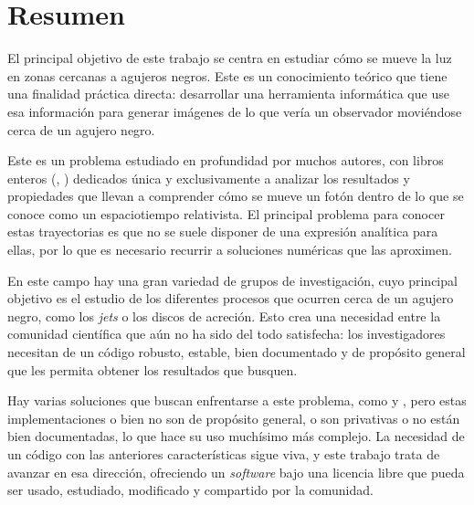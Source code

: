 \begingroup
\let\clearpage\relax
\let\cleardoublepage\relax
\let\cleardoublepage\relax

\chapter*{Resumen}

El principal objetivo de este trabajo se centra en estudiar cómo se mueve la luz en zonas cercanas a agujeros negros. Este es un conocimiento teórico que tiene una finalidad práctica directa: desarrollar una herramienta informática que use esa información para generar imágenes de lo que vería un observador moviéndose cerca de un agujero negro.

Este es un problema estudiado en profundidad por muchos autores, con libros enteros (\cite{oneill83}, \cite{oneill95}) dedicados única y exclusivamente a analizar los resultados y propiedades que llevan a comprender cómo se mueve un fotón dentro de lo que se conoce como un espaciotiempo relativista. El principal problema para conocer estas trayectorias es que no se suele disponer de una expresión analítica para ellas, por lo que es necesario recurrir a soluciones numéricas que las aproximen.

En este campo hay una gran variedad de grupos de investigación, cuyo principal objetivo es el estudio de los diferentes procesos que ocurren cerca de un agujero negro, como los \emph{jets} o los discos de acreción. Esto crea una necesidad entre la comunidad científica que aún no ha sido del todo satisfecha: los investigadores necesitan de un código robusto, estable, bien documentado y de propósito general que les permita obtener los resultados que busquen.

Hay varias soluciones que buscan enfrentarse a este problema, como \cite{thorne15} y \cite{chan13}, pero estas implementaciones o bien no son de propósito general, o son privativas o no están bien documentadas, lo que hace su uso muchísimo más complejo. La necesidad de un código con las anteriores características sigue viva, y este trabajo trata de avanzar en esa dirección, ofreciendo un \emph{software} bajo una licencia libre que pueda ser usado, estudiado, modificado y compartido por la comunidad.


